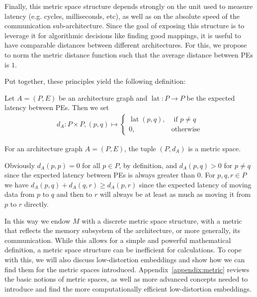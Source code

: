 Finally, this metric space structure depends strongly on the unit used to measure latency (e.g. cycles, milliseconds, etc), as well as on the absolute speed of the communication sub-architecture.
Since the goal of exposing this structure is to leverage it for algorithmic decisions like finding good mappings, it is useful to have comparable distances between different architectures.
For this, we propose to norm the metric distance function such that the average distance between \acp{PE} is $1$.

Put together, these principles yield the following definition:
\begin{defn}
	\label{defn:metric_simple}
Let $A = (P,E)$ be an architecture graph and $\operatorname{lat} : P \rightarrow P$ be the expected latency between PEs.
Then we set
\begin{align}
  d_A : P \times P, (p,q) \mapsto \left\{
      \begin{array}{rr}
        \operatorname{lat}(p,q), & \text{ if } p \neq q \\
        0, & \text{otherwise}
      \end{array} \right.
      \end{align}
\end{defn}
\begin{rem}
For an architecture graph $A = (P,E)$, the tuple $(P,d_A)$ is a metric space.
\begin{bew}
Obviously $d_A(p,p) = 0$ for all $p \in P$, by definition, and $d_A(p,q) > 0$ for $p \neq q$ since the expected latency between PEs is always greater than 0.
For $p,q,r \in P$ we have $d_A(p,q) + d_A(q,r) \geq d_A(p,r)$ since the expected latency of moving data from $p$ to $q$ and then to $r$ will always be at least as much as moving it from $p$ to $r$ directly.
\end{bew}
\end{rem}


In this way we endow $M$ with a discrete metric space structure, with a metric that reflects the memory subsystem of the architecture, or more generally, its communication.
While this allows for a simple and powerful mathematical definition, a metric space structure can be inefficient for calculations.
To cope with this, we will also discuss low-distortion embeddings and show how we can find them for the metric spaces introduced.
Appendix~\ref{appendix:metric} reviews the basic notions of metric spaces, as well as more advanced concepts needed to introduce and find the more computationally efficient low-distortion embeddings.

